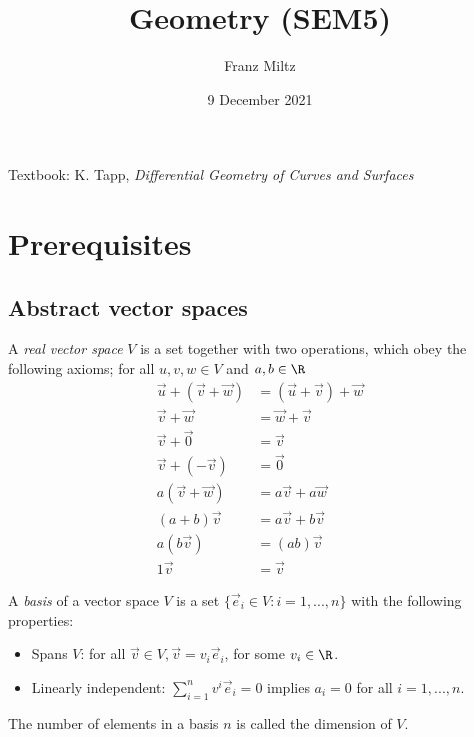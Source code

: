 \documentclass{article}
\begin{document}
\title{Geometry (SEM5)}
\author{Franz Miltz}
\date{9 December 2021}
\maketitle
\noindent Textbook: K. Tapp, \emph{Differential Geometry of Curves and Surfaces}
\tableofcontents
\pagebreak

\section{Prerequisites}

\subsection{Abstract vector spaces}

\begin{definition}[Notes 2.1]
    A \emph{real vector space} $V$ is a set together with two operations, which obey the following
    axioms; for all $u,v,w\in V$ and $a,b\in\R$
    \begin{align*}
        \vec u + (\vec v + \vec w) & = (\vec u + \vec v) + \vec w \\
        \vec v + \vec w            & = \vec w + \vec v            \\
        \vec v + \vec 0            & = \vec v                     \\
        \vec v + (-\vec v)         & = \vec 0                     \\
        a(\vec v + \vec w)         & = a\vec v + a\vec w          \\
        (a+b)\vec v                & = a\vec v + b\vec v          \\
        a(b\vec v)                 & = (ab)\vec v                 \\
        1\vec v                    & = \vec v
    \end{align*}
\end{definition}

\begin{definition}[Notes 2.3]
    A \emph{basis} of a vector space $V$ is a set $\{\vec e_i \in V : i = 1, ..., n\}$
    with the following properties:
    \begin{itemize}
        \item Spans $V$: for all $\vec v\in V, \vec v = v_i \vec e_i$, for some $v_i\in\R$.
        \item Linearly independent: $\sum_{i=1}^n v^i\vec e_i = 0$ implies $a_i = 0$ for all $i=1,...,n$.
    \end{itemize}
    The number of elements in a basis $n$ is called the dimension of $V$.
\end{definition}
\end{document}
